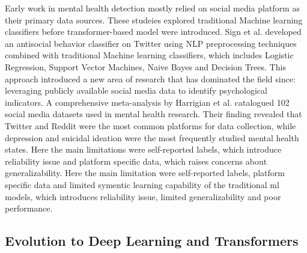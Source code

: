 \documentclass{article}
\begin{document}
Early work in mental health detection mostly relied on social media platform as their primary data sources. These studeies explored traditional Machine learning classifiers before transformer-based model were introduced. Sign et al. \cite{singh2020framework} developed an antisocial behavior classifier on Twitter using NLP preprocessing techniques combined with traditional Machine learning classifiers, which includes Logistic Regression, Support Vector Machines, Naive Bayes and Decision Trees. This approach introduced a new area of research that has dominated the field since: leveraging publicly available social media data to identify psychological indicators. A comprehensive meta-analysis by Harrigian et al. \cite{harrigian2021state} catalogued 102 social media datasets used in mental health research. Their finding revealed that Twitter and Reddit were the most common platforms for data collection, while depression and suicidal ideation were the most frequently studied mental health states. Here the main limitations were self-reported labels, which introduce reliability issue and platform specific data, which raises concerns about generalizability. Here the main limitation were self-reported labels, platform specific data and limited symentic learning capability of the traditional ml models, which introduces reliability issue, limited generalizability and poor performance. 


















\subsection{Evolution to Deep Learning and Transformers}
\end{document}
